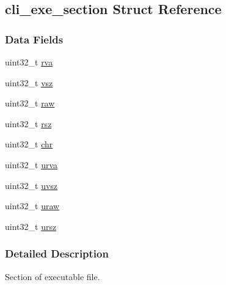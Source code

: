 \hypertarget{structcli__exe__section}{\subsection{cli\-\_\-exe\-\_\-section Struct Reference}
\label{structcli__exe__section}
}
\subsubsection*{Data Fields}
\begin{DoxyCompactItemize}
\item 
uint32\-\_\-t \hyperlink{structcli__exe__section_a428af6b898632e49e1a78a6b75c35597}{rva}
\item 
uint32\-\_\-t \hyperlink{structcli__exe__section_a4e9a2c96ba84fd9dedbed61c9865cbc7}{vsz}
\item 
uint32\-\_\-t \hyperlink{structcli__exe__section_a0a595268561edc58e347ca8387000bc6}{raw}
\item 
uint32\-\_\-t \hyperlink{structcli__exe__section_a9d1a35dea930f9ddac78908ca3dce76b}{rsz}
\item 
uint32\-\_\-t \hyperlink{structcli__exe__section_a0737a11eee3c5a5d691fade6df9f5094}{chr}
\item 
uint32\-\_\-t \hyperlink{structcli__exe__section_a932862bb5ce030d0e6f007068e7817d6}{urva}
\item 
uint32\-\_\-t \hyperlink{structcli__exe__section_a4241ef43b0b01fea785fe76ba7054a37}{uvsz}
\item 
uint32\-\_\-t \hyperlink{structcli__exe__section_a1c392d2998c0846b21909814e4706a1e}{uraw}
\item 
uint32\-\_\-t \hyperlink{structcli__exe__section_a69f4a0067dad89980f815b5704f5f8da}{ursz}
\end{DoxyCompactItemize}


\subsubsection{Detailed Description}
Section of executable file. 


